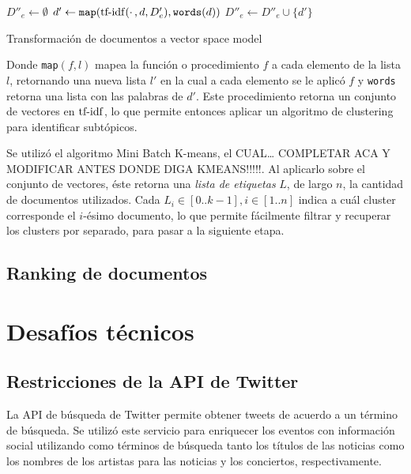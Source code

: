 \begin{algorithm}[H]
$D''_e \leftarrow \emptyset$ \;
 {
   $d' \leftarrow \texttt{map}(\operatorname{tf-idf}(\cdotp, d, D'_e), \texttt{words}(d))$\;
}
$D''_e \leftarrow D''_e \cup \{d'\}$\;
\caption{Transformación de documentos a vector space model}
\end{algorithm}

    Donde \texttt{map}$(f,l)$ mapea la
    función o procedimiento $f$ a cada elemento de la lista $l$,
    retornando una nueva lista $l'$ en la cual a cada elemento se le
    aplicó $f$ y \texttt{words} retorna una lista con las palabras de
    $d'$. Este procedimiento retorna un conjunto de vectores en
    $\operatorname{tf-idf}$, lo que permite entonces aplicar un algoritmo de
    clustering para identificar subtópicos.

    Se utilizó el algoritmo Mini Batch K-means, el CUAL\ldots{} COMPLETAR
    ACA Y MODIFICAR ANTES DONDE DIGA KMEANS!!!!!. Al aplicarlo sobre
    el conjunto de vectores, éste retorna una \emph{lista de etiquetas}
    $L$, de largo $n$, la cantidad de documentos utilizados. Cada
    $L_i \in [0..k-1], i \in [1..n]$ indica a cuál cluster corresponde
    el $i$-ésimo documento, lo que permite fácilmente filtrar y
    recuperar los clusters por separado, para pasar a la siguiente
    etapa.

\subsection{Ranking de documentos}
\label{sec-4.2.3}




\section{Desafíos técnicos}
\label{sec-4.3}

\subsection{Restricciones de la API de Twitter}
\label{sec-4.3.1}


   La API de búsqueda de Twitter permite obtener tweets de acuerdo a un
   término de búsqueda. Se utilizó este servicio para enriquecer los
   eventos con información social utilizando como términos de búsqueda
   tanto los títulos de las noticias como los nombres de los artistas
   para las noticias y los conciertos, respectivamente.

